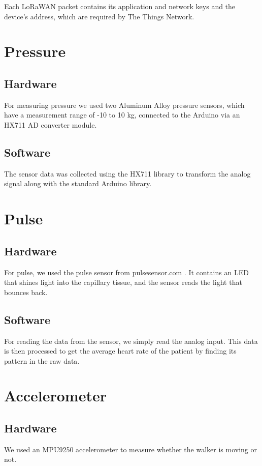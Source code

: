 		Each LoRaWAN packet contains its application and network keys and the device's address, which are required by The Things Network.

\section{Pressure}
	\subsection*{Hardware}
	For measuring pressure we used two Aluminum Alloy pressure sensors, which have a measurement range of -10 to 10 kg, connected to the Arduino via an HX711 AD \cite{pressureds} converter module. 

	\subsection*{Software}
	The sensor data was collected using the HX711 library to transform the analog signal along with the standard Arduino library. 

\section{Pulse}

	\subsection*{Hardware}
	For pulse, we used the pulse sensor from pulsesensor.com \cite{pulseds}. It contains an LED that shines light into the capillary tissue, and the sensor reads the light that bounces back.

	\subsection*{Software}
	For reading the data from the sensor, we simply read the analog input. This data is then processed to get the average heart rate of the patient by finding its pattern in the raw data.

\section{Accelerometer}

	\subsection*{Hardware}
	We used an MPU9250 accelerometer \cite{accelds} to measure whether the walker is moving or not.

